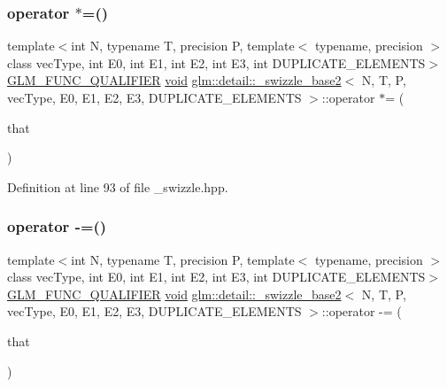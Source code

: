 \subsubsection{\texorpdfstring{operator $\ast$=()}{operator *=()}}
{\footnotesize\ttfamily template$<$int N, typename T, precision P, template$<$ typename, precision $>$ class vec\+Type, int E0, int E1, int E2, int E3, int D\+U\+P\+L\+I\+C\+A\+T\+E\+\_\+\+E\+L\+E\+M\+E\+N\+TS$>$ \\
\mbox{\hyperlink{setup_8hpp_a33fdea6f91c5f834105f7415e2a64407}{G\+L\+M\+\_\+\+F\+U\+N\+C\+\_\+\+Q\+U\+A\+L\+I\+F\+I\+ER}} \mbox{\hyperlink{glad_8h_a950fc91edb4504f62f1c577bf4727c29}{void}} \mbox{\hyperlink{structglm_1_1detail_1_1__swizzle__base2}{glm\+::detail\+::\+\_\+swizzle\+\_\+base2}}$<$ N, T, P, vec\+Type, E0, E1, E2, E3, D\+U\+P\+L\+I\+C\+A\+T\+E\+\_\+\+E\+L\+E\+M\+E\+N\+TS $>$\+::operator $\ast$= (\begin{DoxyParamCaption}\item[{vec\+Type$<$ T, P $>$ const \&}]{that }\end{DoxyParamCaption})\hspace{0.3cm}{\ttfamily [inline]}}



Definition at line 93 of file \+\_\+swizzle.\+hpp.

\mbox{\label{structglm_1_1detail_1_1__swizzle__base2_a33ee76f7d3166420cefe42d25654e794}} 
\subsubsection{\texorpdfstring{operator -\/=()}{operator -=()}}
{\footnotesize\ttfamily template$<$int N, typename T, precision P, template$<$ typename, precision $>$ class vec\+Type, int E0, int E1, int E2, int E3, int D\+U\+P\+L\+I\+C\+A\+T\+E\+\_\+\+E\+L\+E\+M\+E\+N\+TS$>$ \\
\mbox{\hyperlink{setup_8hpp_a33fdea6f91c5f834105f7415e2a64407}{G\+L\+M\+\_\+\+F\+U\+N\+C\+\_\+\+Q\+U\+A\+L\+I\+F\+I\+ER}} \mbox{\hyperlink{glad_8h_a950fc91edb4504f62f1c577bf4727c29}{void}} \mbox{\hyperlink{structglm_1_1detail_1_1__swizzle__base2}{glm\+::detail\+::\+\_\+swizzle\+\_\+base2}}$<$ N, T, P, vec\+Type, E0, E1, E2, E3, D\+U\+P\+L\+I\+C\+A\+T\+E\+\_\+\+E\+L\+E\+M\+E\+N\+TS $>$\+::operator -\/= (\begin{DoxyParamCaption}\item[{vec\+Type$<$ T, P $>$ const \&}]{that }\end{DoxyParamCaption})\hspace{0.3cm}{\ttfamily [inline]}}



